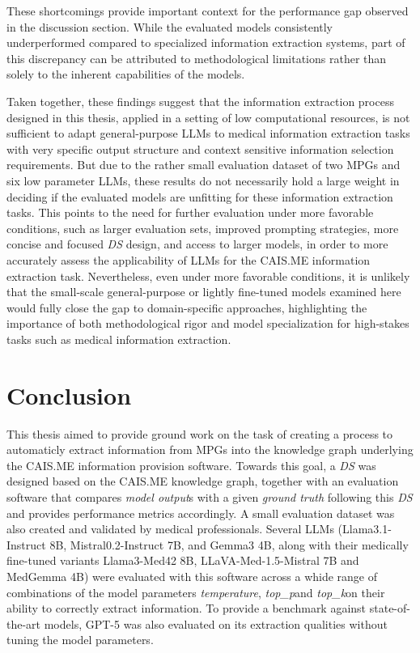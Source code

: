 \documentclass[bs, english]{stthesis}
\newcommand{\temperature}{{\textit{temperature}}}
\newcommand{\topP}{{\textit{top\_p}}}
\newcommand{\topK}{{\textit{top\_k}}}
\begin{document}
These shortcomings provide important context for the performance gap observed in the discussion section. While the evaluated models consistently underperformed compared to specialized information extraction systems, part of this discrepancy can be attributed to methodological limitations rather than solely to the inherent capabilities of the models. 

Taken together, these findings suggest that the information extraction process designed in this thesis, applied in a setting of low computational resources, is not sufficient to adapt general-purpose LLMs to medical information extraction tasks with very specific output structure and context sensitive information selection requirements.
But due to the rather small evaluation dataset of two MPGs and six low parameter LLMs, these results do not necessarily hold a large weight in deciding if the evaluated models are unfitting for these information extraction tasks.
This points to the need for further evaluation under more favorable conditions, such as larger evaluation sets, improved prompting strategies, more concise and focused \textit{DS} design, and access to larger models, in order to more accurately assess the applicability of LLMs for the CAIS.ME information extraction task. 
Nevertheless, even under more favorable conditions, it is unlikely that the small-scale general-purpose or lightly fine-tuned models examined here would fully close the gap to domain-specific approaches, highlighting the importance of both methodological rigor and model specialization for high-stakes tasks such as medical information extraction.

\chapter{Conclusion}
\label{ch:Conclusion}

This thesis aimed to provide ground work on the task of creating a process to automaticly extract information from MPGs into the knowledge graph underlying the CAIS.ME information provision software. Towards this goal, a \textit{DS} was designed based on the CAIS.ME knowledge graph, together with an evaluation software that compares \textit{model output}s with a given \textit{ground truth} following this \textit{DS} and provides performance metrics accordingly. A small evaluation dataset was also created and validated by medical professionals. Several LLMs (Llama3.1-Instruct 8B, Mistral0.2-Instruct 7B, and Gemma3 4B, along with their medically fine-tuned variants Llama3-Med42 8B, LLaVA-Med-1.5-Mistral 7B and MedGemma 4B) were evaluated with this software across a whide range of combinations of the model parameters \temperature, \topP and \topK on their ability to correctly extract information. To provide a benchmark against state-of-the-art models, GPT-5 was also evaluated on its extraction qualities without tuning the model parameters.
\end{document}
